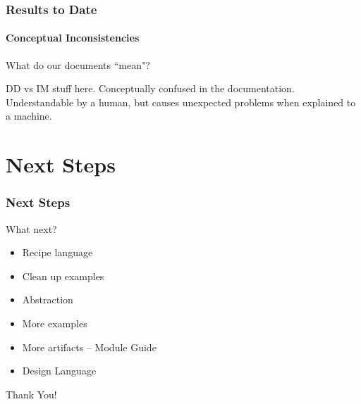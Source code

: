 \documentclass{beamer}
\begin{document}

\begin{frame}[fragile]

\frametitle{Results to Date} %
\framesubtitle{Conceptual Inconsistencies}

What do our documents ``mean"?

DD vs IM stuff here. Conceptually confused in the documentation. 
Understandable by a human, but causes unexpected problems when explained to a machine.

\begin{itemize}

\end{itemize}

\end{frame}


\section[Next Steps]{Next Steps}


\begin{frame}

\frametitle{Next Steps}


\begin{Large}
What next?
\end{Large}

\begin{itemize}
\item Recipe language %
\item Clean up examples
\item Abstraction
\item More examples
\item More artifacts -- Module Guide
\item Design Language
\end{itemize}
\end{frame}


\begin{frame}
\begin{center}
\Huge Thank You!
\end{center}
\end{frame}

\end{document}
